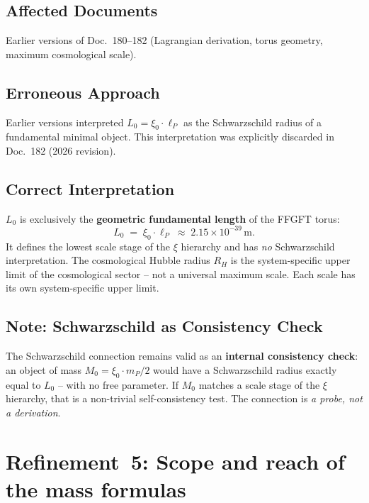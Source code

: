 \subsection*{Affected Documents}

Earlier versions of Doc.~180--182 (Lagrangian derivation, torus geometry,
maximum cosmological scale).

\subsection*{Erroneous Approach}

Earlier versions interpreted $L_0 = \xi_0 \cdot \ell_P$ as the
Schwarzschild radius of a fundamental minimal object. This
interpretation was explicitly discarded in Doc.~182 (2026 revision).

\subsection*{Correct Interpretation}

$L_0$ is exclusively the \textbf{geometric fundamental length} of the
FFGFT torus:
\begin{equation}
  L_0 \;=\; \xi_0 \cdot \ell_P \;\approx\; 2.15 \times 10^{-39}\,\text{m}.
  \tag{190.10}
\end{equation}
It defines the lowest scale stage of the $\xi$ hierarchy and has
\emph{no} Schwarzschild interpretation. The cosmological Hubble radius
$R_H$ is the system-specific upper limit of the cosmological sector --
not a universal maximum scale. Each scale has its own
system-specific upper limit.

\subsection*{Note: Schwarzschild as Consistency Check}

The Schwarzschild connection remains valid as an
\textbf{internal consistency check}: an object of mass
$M_0 = \xi_0 \cdot m_P / 2$ would have a Schwarzschild radius
exactly equal to $L_0$ -- with no free parameter. If $M_0$ matches a
scale stage of the $\xi$ hierarchy, that is a non-trivial
self-consistency test. The connection is \emph{a probe, not a derivation}.

\section{Refinement~5: Scope and reach of the mass formulas}

